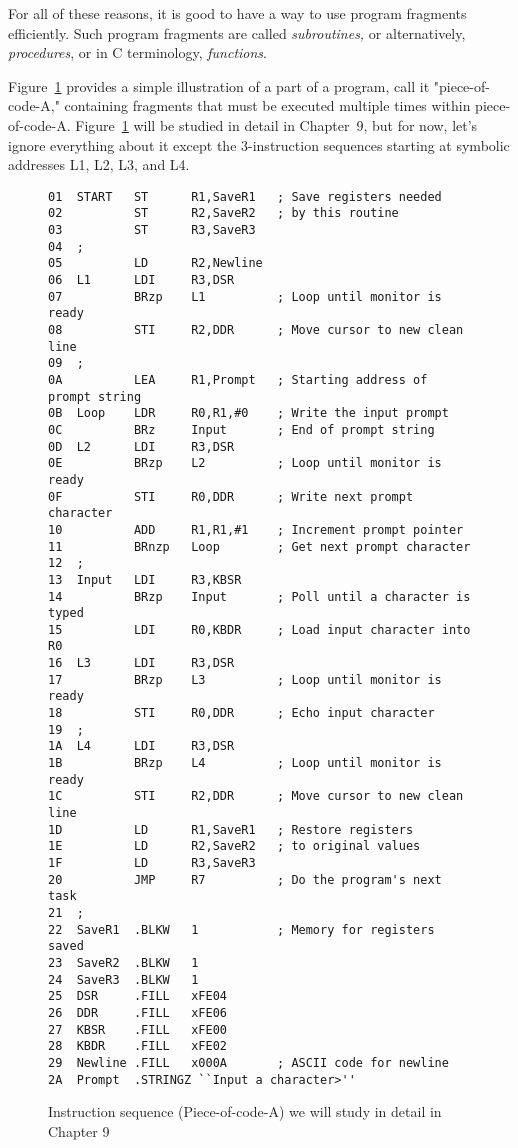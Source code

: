 \documentclass{patt}
\begin{document}
For all of these reasons, it is good to have a way to use program
fragments efficiently.  Such program fragments are called {\em
subroutines,} or alternatively, {\em procedures}, or in C terminology,
{\em functions}.

Figure~\ref{fig:piece.of.code} provides a simple illustration of a part of a
program, call it "piece-of-code-A," containing fragments that must be executed 
multiple times within piece-of-code-A.  Figure~\ref{fig:piece.of.code}
will be studied in detail in Chapter~9, but for now, let's ignore everything
about it except the 3-instruction sequences starting at symbolic addresses 
L1, L2, L3, and L4.  


\begin{figure}[h!]
\begin{Verbatim}[fontsize=\fontsize{9}{11}\selectfont]
01  START   ST      R1,SaveR1   ; Save registers needed
02          ST      R2,SaveR2   ; by this routine
03          ST      R3,SaveR3
04  ;
05          LD      R2,Newline
06  L1      LDI     R3,DSR
07          BRzp    L1          ; Loop until monitor is ready
08          STI     R2,DDR      ; Move cursor to new clean line
09  ;
0A          LEA     R1,Prompt   ; Starting address of prompt string
0B  Loop    LDR     R0,R1,#0    ; Write the input prompt
0C          BRz     Input       ; End of prompt string
0D  L2      LDI     R3,DSR
0E          BRzp    L2          ; Loop until monitor is ready
0F          STI     R0,DDR      ; Write next prompt character
10          ADD     R1,R1,#1    ; Increment prompt pointer
11          BRnzp   Loop        ; Get next prompt character
12  ;
13  Input   LDI     R3,KBSR
14          BRzp    Input       ; Poll until a character is typed
15          LDI     R0,KBDR     ; Load input character into R0
16  L3      LDI     R3,DSR
17          BRzp    L3          ; Loop until monitor is ready
18          STI     R0,DDR      ; Echo input character
19  ;
1A  L4      LDI     R3,DSR
1B          BRzp    L4          ; Loop until monitor is ready
1C          STI     R2,DDR      ; Move cursor to new clean line
1D          LD      R1,SaveR1   ; Restore registers
1E          LD      R2,SaveR2   ; to original values
1F          LD      R3,SaveR3
20          JMP     R7          ; Do the program's next task
21  ;
22  SaveR1  .BLKW   1           ; Memory for registers saved
23  SaveR2  .BLKW   1
24  SaveR3  .BLKW   1
25  DSR     .FILL   xFE04
26  DDR     .FILL   xFE06
27  KBSR    .FILL   xFE00
28  KBDR    .FILL   xFE02
29  Newline .FILL   x000A       ; ASCII code for newline
2A  Prompt  .STRINGZ ``Input a character>''
\end{Verbatim}
\caption{Instruction sequence (Piece-of-code-A) we will study in detail in Chapter 9}
\label{fig:piece.of.code}
\end{figure}
\end{document}
